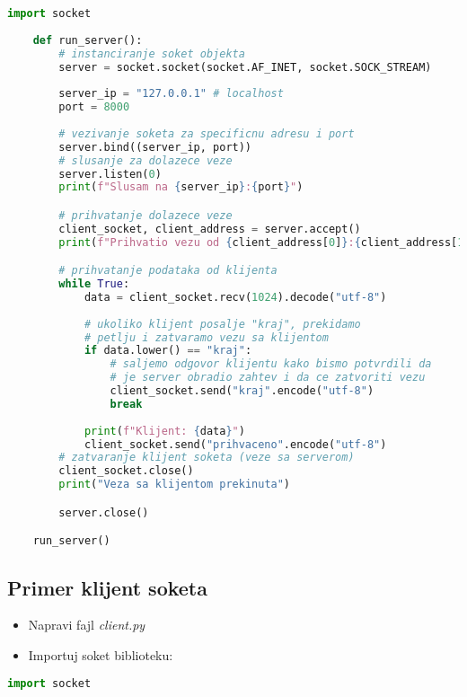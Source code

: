 \begin{lstlisting}[language = Python]
    import socket
    
    def run_server():
        # instanciranje soket objekta
        server = socket.socket(socket.AF_INET, socket.SOCK_STREAM)
    
        server_ip = "127.0.0.1" # localhost
        port = 8000
    
        # vezivanje soketa za specificnu adresu i port
        server.bind((server_ip, port))
        # slusanje za dolazece veze
        server.listen(0)
        print(f"Slusam na {server_ip}:{port}")

        # prihvatanje dolazece veze
        client_socket, client_address = server.accept()
        print(f"Prihvatio vezu od {client_address[0]}:{client_address[1]}")

        # prihvatanje podataka od klijenta
        while True:
            data = client_socket.recv(1024).decode("utf-8")
    
            # ukoliko klijent posalje "kraj", prekidamo
            # petlju i zatvaramo vezu sa klijentom
            if data.lower() == "kraj":
                # saljemo odgovor klijentu kako bismo potvrdili da
                # je server obradio zahtev i da ce zatvoriti vezu
                client_socket.send("kraj".encode("utf-8")
                break
    
            print(f"Klijent: {data}")
            client_socket.send("prihvaceno".encode("utf-8")
        # zatvaranje klijent soketa (veze sa serverom)
        client_socket.close()
        print("Veza sa klijentom prekinuta")

        server.close()

    run_server()
\end{lstlisting}

\newpage

\subsection{Primer klijent soketa}

\begin{itemize}
    \item Napravi fajl \emph{client.py}
    \item Importuj soket biblioteku:
\end{itemize}

\vspace{0.5cm}

\begin{lstlisting}[language = Python]
    import socket
\end{lstlisting}

